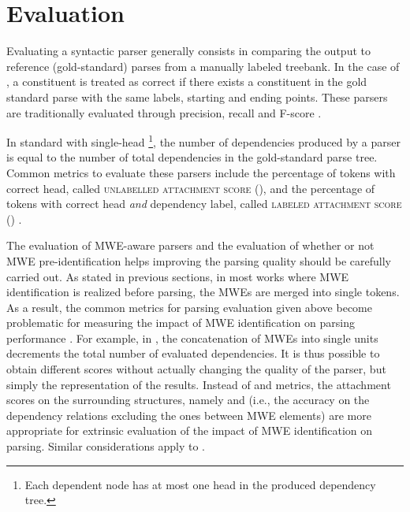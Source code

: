 \documentclass[output=paper]{langsci/langscibook}
\begin{document}
  

%
\section{Evaluation}
\label{con:sec:evaluation}
Evaluating a syntactic parser generally consists in comparing the output to reference  (gold-standard) parses from  a manually labeled treebank.
In the case of , a constituent is treated as correct if there exists a constituent in the gold standard parse with the same labels, starting and ending points. These parsers are traditionally evaluated through precision, recall and F-score \citep{abney1991procedure,sekine1997evalb}. 

In standard  with single-head \footnote{Each dependent node has at most one head in the produced dependency tree.}, the number of dependencies produced by a parser is equal to the number of total dependencies in the gold-standard parse tree. Common metrics to evaluate these parsers include the percentage of tokens with correct head, called \textsc{unlabelled attachment score} (\asu), and the percentage of tokens with correct head \emph{and} dependency label, called \textsc{labeled attachment score} (\asl) \citep{conllx,nilsson2007conll}. 

The evaluation of MWE-aware parsers and the evaluation of  whether or not MWE pre-identification helps  improving the parsing quality should be carefully carried out.
As stated in previous sections, in most works where MWE identification is realized before parsing, the MWEs are merged into  single tokens.  
As a result, the common metrics for parsing evaluation given above become problematic for measuring the impact of MWE identification on parsing performance \citep{eryigit:2011:multiword}.
For example, in ,
the concatenation of MWEs into single units  decrements the total number of evaluated dependencies. It is thus possible to obtain different scores without actually changing the quality of the parser, but simply the representation of the results. Instead of \asu{} and \asl{} metrics, the attachment scores on the surrounding structures, namely \asus{} and \asls{} (i.e., the accuracy on the dependency relations excluding the ones between MWE elements) are more appropriate for extrinsic evaluation of the impact of MWE identification on parsing. Similar considerations apply to .
\end{document}
